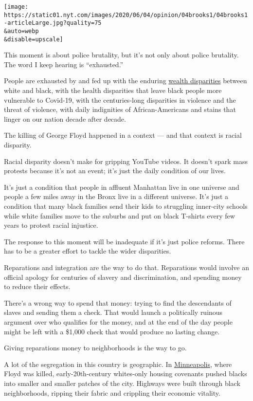 \texttt{[image: https://static01.nyt.com/images/2020/06/04/opinion/04brooks1/04brooks1-articleLarge.jpg?quality=75\\\&auto=webp\\\&disable=upscale]}

This moment is about police brutality, but it's not only about police
brutality. The word I keep hearing is ``exhausted.''

People are exhausted by and fed up with the enduring
\href{https://www.brookings.edu/blog/up-front/2020/02/27/examining-the-black-white-wealth-gap/}{wealth
disparities} between white and black, with the health disparities that
leave black people more vulnerable to Covid-19, with the centuries-long
disparities in violence and the threat of violence, with daily
indignities of African-Americans and stains that linger on our nation
decade after decade.

The killing of George Floyd happened in a context --- and that context
is racial disparity.

Racial disparity doesn't make for gripping YouTube videos. It doesn't
spark mass protests because it's not an event; it's just the daily
condition of our lives.

It's just a condition that people in affluent Manhattan live in one
universe and people a few miles away in the Bronx live in a different
universe. It's just a condition that many black families send their kids
to struggling inner-city schools while white families move to the
suburbs and put on black T-shirts every few years to protest racial
injustice.

The response to this moment will be inadequate if it's just police
reforms. There has to be a greater effort to tackle the wider
disparities.

Reparations and integration are the way to do that. Reparations would
involve an official apology for centuries of slavery and discrimination,
and spending money to reduce their effects.

There's a wrong way to spend that money: trying to find the descendants
of slaves and sending them a check. That would launch a politically
ruinous argument over who qualifies for the money, and at the end of the
day people might be left with a \$1,000 check that would produce no
lasting change.

Giving reparations money to neighborhoods is the way to go.

A lot of the segregation in this country is geographic. In
\href{https://www.washingtonpost.com/business/2020/05/30/minneapolis-racial-inequality/}{Minneapolis},
where Floyd was killed, early-20th-century whites-only housing covenants
pushed blacks into smaller and smaller patches of the city. Highways
were built through black neighborhoods, ripping their fabric and
crippling their economic vitality.

